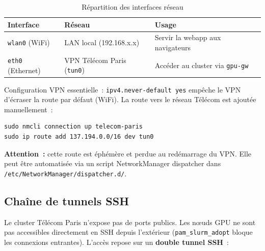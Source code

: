 \documentclass[a4paper,11pt]{article}
\newcommand{\file}[1]{\texttt{#1}}
\begin{document}
\begin{table}[H]
\centering
\caption{Répartition des interfaces réseau}
\label{tab:interfaces}
\begin{tabularx}{\textwidth}{@{}l l X@{}}
\toprule
\textbf{Interface} & \textbf{Réseau} & \textbf{Usage} \\
\midrule
\texttt{wlan0} (WiFi)     & LAN local (192.168.x.x) & Servir la webapp aux navigateurs \\
\texttt{eth0} (Ethernet)  & VPN Télécom Paris (\texttt{tun0}) & Accéder au cluster via \texttt{gpu-gw} \\
\bottomrule
\end{tabularx}
\end{table}

Configuration VPN essentielle~: \texttt{ipv4.never-default yes} empêche
le VPN d'écraser la route par défaut (WiFi). La route vers le réseau
Télécom est ajoutée manuellement~:

\begin{lstlisting}[style=bash]
sudo nmcli connection up telecom-paris
sudo ip route add 137.194.0.0/16 dev tun0
\end{lstlisting}

\textbf{Attention~:} cette route est éphémère et perdue au redémarrage du
VPN. Elle peut être automatisée via un script NetworkManager dispatcher
dans \file{/etc/NetworkManager/dispatcher.d/}.

\subsection{Chaîne de tunnels SSH}
\label{sec:tunnels}

Le cluster Télécom Paris n'expose pas de ports publics. Les nœuds GPU ne
sont pas accessibles directement en SSH depuis l'extérieur
(\texttt{pam\_slurm\_adopt} bloque les connexions entrantes). L'accès
repose sur un \textbf{double tunnel SSH}~:
\end{document}

